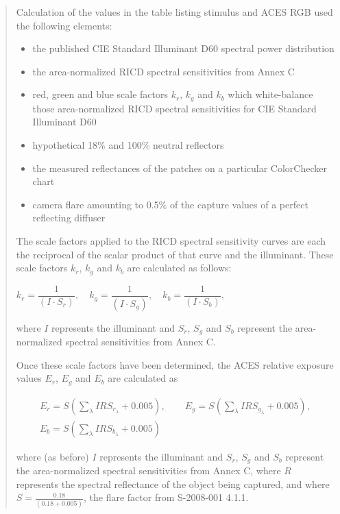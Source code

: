 \begin{quote}
Calculation of the values in the table listing stimulus and ACES RGB used the following elements:
	
\begin{itemize}
	\item the published CIE Standard Illuminant D60 spectral power distribution
	\item the area-normalized RICD spectral sensitivities from Annex C
	\item red, green and blue scale factors $k_r$, $k_g$ and $k_b$ which white-balance those area-normalized RICD spectral sensitivities for CIE Standard Illuminant D60
	\item hypothetical 18\% and 100\% neutral reflectors
	\item the measured reflectances of the patches on a particular ColorChecker chart
	\item camera flare amounting to 0.5\% of the capture values of a perfect reflecting diffuser	
\end{itemize}

The scale factors applied to the RICD spectral sensitivity curves are each the reciprocal of the scalar product of that curve and the illuminant. These scale factors $k_r$, $k_g$ and $k_b$ are calculated as follows:


\begin{center}
$k_r=\dfrac{1}{(I\cdot{S_r})},\quad k_g=\dfrac{1}{(I\cdot{S_g})},\quad k_b=\dfrac{1}{(I\cdot{S_b})},$	
\end{center}

where $I$ represents the illuminant and $S_r$, $S_g$ and $S_b$ represent the area-normalized spectral sensitivities from Annex C.

Once these scale factors have been determined, the ACES relative exposure values $E_r$, $E_g$ and $E_b$ are calculated as

\begin{floatequ}
\begin{gather}
E_r=S\left(\displaystyle\sum_\lambda IRS_{r_\lambda}+0.005\right), \quad\quad E_g=S\left(\displaystyle\sum_\lambda IRS_{g_\lambda}+0.005\right),\\
E_b=S\left(\displaystyle\sum_\lambda IRS_{b_\lambda}+0.005\right)
\end{gather} 
\end{floatequ}
\vspace{-20pt}

where (as before) $I$ represents the illuminant and $S_r$, $S_g$ and $S_b$ represent the area-normalized spectral sensitivities from Annex C, where $R$ represents the spectral reflectance of the object being captured, and where $S=\frac{0.18}{(0.18+0.005)}$, the flare factor from S-2008-001 4.1.1.

\end{quote}